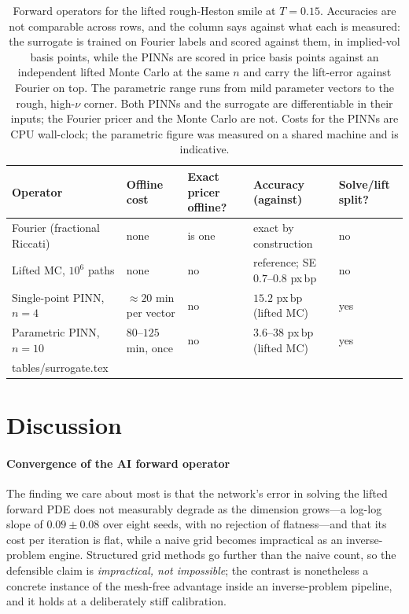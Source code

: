 \documentclass[preprint,12pt]{elsarticle}
\makeatletter
\newcommand{\bp}{\ensuremath{\,\mathrm{bp}}}
\newcommand{\revrows}[1]{\@@input tables/#1.tex }
\makeatother
\begin{document}
\begin{table}[!htbp]
\centering
\caption{Forward operators for the lifted rough-Heston smile at $T{=}0.15$.
Accuracies are not comparable across rows, and the column says against what each
is measured: the surrogate is trained on Fourier labels and scored against them,
in implied-vol basis points, while the PINNs are scored in price basis points
against an independent lifted Monte Carlo at the same $n$ and carry the
lift-error against Fourier on top. The parametric range runs from mild
parameter vectors to the rough, high-$\nu$ corner. Both PINNs and the surrogate
are differentiable in their inputs; the Fourier pricer and the Monte Carlo are
not. Costs for the PINNs are CPU wall-clock; the parametric figure was measured
on a shared machine and is indicative.}
\label{tab:operators}
\footnotesize
\begin{tabularx}{\linewidth}{@{}>{\raggedright\arraybackslash}X >{\raggedright\arraybackslash}p{2.3cm} >{\centering\arraybackslash}p{1.5cm} >{\raggedright\arraybackslash}p{2.7cm} >{\centering\arraybackslash}p{1.5cm}@{}}
\toprule
Operator & Offline cost & Exact pricer offline? & Accuracy (against) & Solve/lift split? \\
\midrule
Fourier (fractional Riccati) & none & is one & exact by construction & no \\
Lifted MC, $10^6$ paths & none & no & reference; SE $0.7$--$0.8$ px\bp & no \\
Single-point PINN, $n{=}4$ & ${\approx}20$ min per vector & no & $15.2$ px\bp{} (lifted MC) & yes \\
Parametric PINN, $n{=}10$ & $80$--$125$ min, once & no & $3.6$--$38$ px\bp{} (lifted MC) & yes \\
\revrows{surrogate}
\bottomrule
\end{tabularx}
\end{table}
\fi

\section{Discussion}
\label{sec:disc}

\paragraph{Convergence of the AI forward operator}
The finding we care about most is that the network's error in solving the lifted
forward PDE does not measurably degrade as the dimension grows---a log-log slope
of $0.09\pm0.08$ over eight seeds, with no rejection of flatness---and that its
cost per iteration is flat, while a naive grid becomes impractical as an
inverse-problem engine. Structured grid methods go further than the naive count,
so the defensible claim is \emph{impractical, not impossible}; the contrast is
nonetheless a concrete instance of the mesh-free advantage inside an
inverse-problem pipeline, and it holds at a deliberately stiff calibration.
\end{document}
